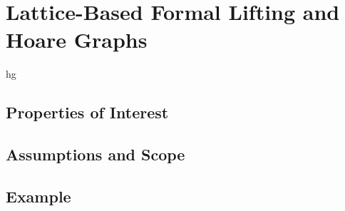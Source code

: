 \chapter{Lattice-Based Formal Lifting and Hoare Graphs}\label{ch:hg-lifting}

\label{hg-intro}

\Ac{hg}

\section{Properties of Interest}

\section{Assumptions and Scope}

\section{Example}
